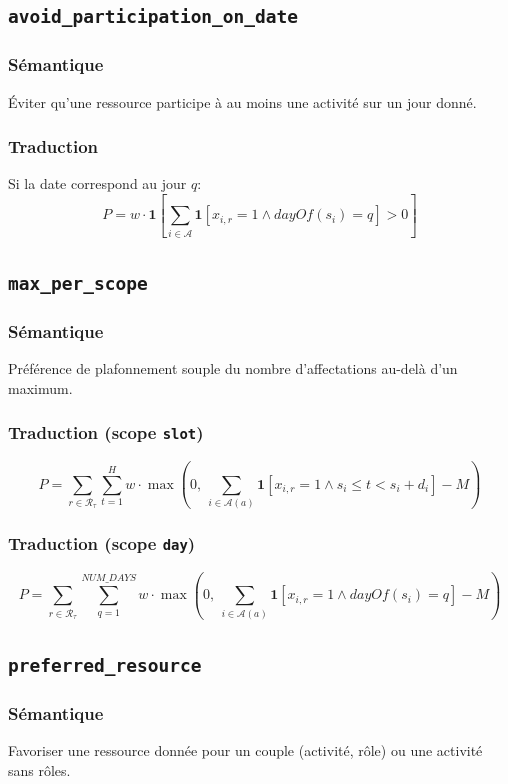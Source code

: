 \documentclass[12pt,a4paper]{article}
\begin{document}
\subsection{\texttt{avoid\_participation\_on\_date}}
\subsubsection*{Sémantique}
Éviter qu'une ressource participe à au moins une activité sur un jour donné.

\subsubsection*{Traduction}
Si la date correspond au jour \(q\):
\[
P = w\cdot \mathbf{1}\left[\sum_{i\in\mathcal{A}} \mathbf{1}[x_{i,r}=1 \land dayOf(s_i)=q] > 0\right]
\]

\subsection{\texttt{max\_per\_scope}}
\subsubsection*{Sémantique}
Préférence de plafonnement souple du nombre d'affectations au-delà d'un maximum.

\subsubsection*{Traduction (scope \texttt{slot})}
\[
P = \sum_{r\in\mathcal{R}_\tau}\sum_{t=1}^{H}
w\cdot \max\left(0,\ \sum_{i\in\mathcal{A}(a)}\mathbf{1}[x_{i,r}=1 \land s_i\le t<s_i+d_i]-M\right)
\]

\subsubsection*{Traduction (scope \texttt{day})}
\[
P = \sum_{r\in\mathcal{R}_\tau}\sum_{q=1}^{NUM\_DAYS}
w\cdot \max\left(0,\ \sum_{i\in\mathcal{A}(a)}\mathbf{1}[x_{i,r}=1 \land dayOf(s_i)=q]-M\right)
\]

\subsection{\texttt{preferred\_resource}}
\subsubsection*{Sémantique}
Favoriser une ressource donnée pour un couple (activité, rôle) ou une activité sans rôles.
\end{document}

